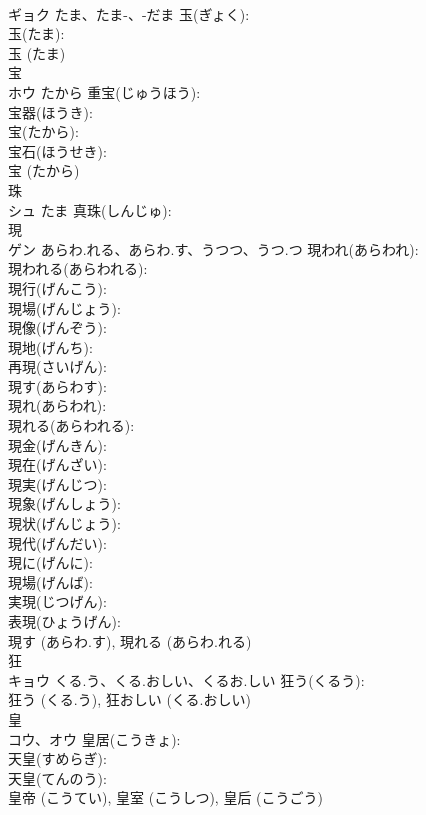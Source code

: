 \documentclass[8pt]{extreport}
\begin{document}
\begin{CJK}{UTF8}{min}
\\	ギョク	たま、たま-、-だま	玉(ぎょく): 
\\	玉(たま): 
\\	玉 (たま)
\\	宝			
\\	ホウ	たから	重宝(じゅうほう): 
\\	宝器(ほうき): 
\\	宝(たから): 
\\	宝石(ほうせき): 
\\	宝 (たから)
\\	珠			
\\	シュ	たま	真珠(しんじゅ): 
\\	現			
\\	ゲン	あらわ.れる、あらわ.す、うつつ、うつ.つ	現われ(あらわれ): 
\\	現われる(あらわれる): 
\\	現行(げんこう): 
\\	現場(げんじょう): 
\\	現像(げんぞう): 
\\	現地(げんち): 
\\	再現(さいげん): 
\\	現す(あらわす): 
\\	現れ(あらわれ): 
\\	現れる(あらわれる): 
\\	現金(げんきん): 
\\	現在(げんざい): 
\\	現実(げんじつ): 
\\	現象(げんしょう): 
\\	現状(げんじょう): 
\\	現代(げんだい): 
\\	現に(げんに): 
\\	現場(げんば): 
\\	実現(じつげん): 
\\	表現(ひょうげん): 
\\	現す (あらわ.す), 現れる (あらわ.れる)
\\	狂			
\\	キョウ	くる.う、くる.おしい、くるお.しい	狂う(くるう): 
\\	狂う (くる.う), 狂おしい (くる.おしい)
\\	皇			
\\	コウ、オウ		皇居(こうきょ): 
\\	天皇(すめらぎ): 
\\	天皇(てんのう): 
\\	皇帝 (こうてい), 皇室 (こうしつ), 皇后 (こうごう)

\end{CJK}
\end{document}
